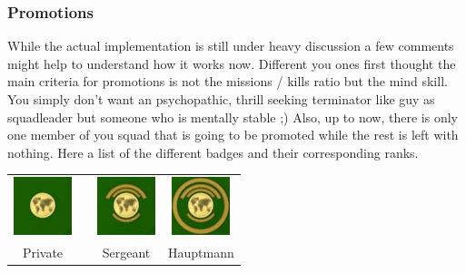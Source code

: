 \subsubsection{Promotions}
While the actual implementation is still under heavy discussion a few comments might help to understand how it works now. Different you ones first thought the main criteria for promotions is not the missions / kills ratio but the mind skill. You simply don't want an psychopathic, thrill seeking terminator like guy as squadleader but someone who is mentally stable ;) Also, up to now, there is only one member of you squad that is going to be promoted while the rest is left with nothing.
Here a list of the different badges and their corresponding ranks.
\begin{tabular}{cccc}
\item \includegraphics[scale=1]{images/badges_rekrut_final.jpg} & & \item \includegraphics[scale=1]{images/badges_sergeant_final.jpg} & \item \includegraphics[scale=1]{images/badges_hauptmann_final.jpg}\\ 
Private & & Sergeant & Hauptmann\\  
\end{tabular} 

